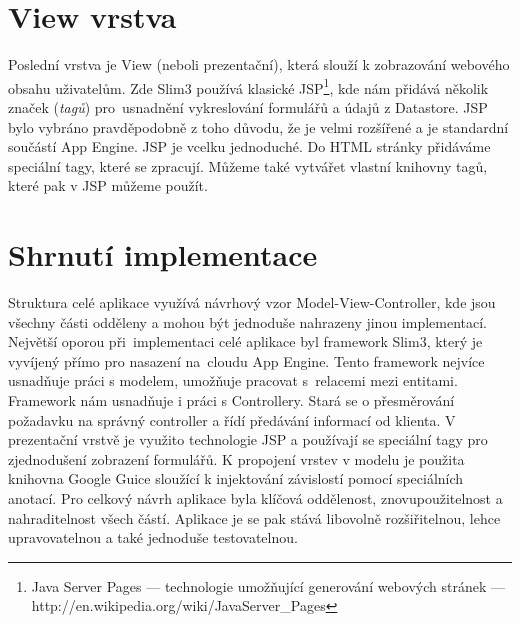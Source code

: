 \section{View vrstva}
Poslední vrstva je View (neboli prezentační), která slouží k zobrazování webového obsahu uživatelům. Zde Slim3 používá klasické JSP\footnote{Java Server Pages --- technologie umožňující generování webových stránek ---  http://en.wikipedia.org/wiki/JavaServer\_Pages}, kde nám přidává několik značek (\emph{tagů}) pro~usnadnění vykreslování formulářů a údajů z Datastore. JSP bylo vybráno pravděpodobně z toho důvodu, že je velmi rozšířené a je standardní součástí App Engine. JSP je vcelku jednoduché. Do HTML stránky přidáváme speciální tagy, které se zpracují. Můžeme také vytvářet vlastní knihovny tagů, které pak v JSP můžeme použít.

\section{Shrnutí implementace}
Struktura celé aplikace využívá návrhový vzor Model-View-Controller, kde jsou všechny části odděleny a mohou být jednoduše nahrazeny jinou implementací. Největší oporou při~implementaci celé aplikace byl framework Slim3, který je vyvíjený přímo pro nasazení na~cloudu App Engine. Tento framework nejvíce usnadňuje práci s modelem, umožňuje pracovat s~relacemi mezi entitami. Framework nám usnadňuje i práci s Controllery. Stará se o přesměrování požadavku na správný controller a řídí předávání informací od klienta. V prezentační vrstvě je využito technologie JSP a používají se speciální tagy pro zjednodušení zobrazení formulářů. K propojení vrstev v modelu je použita knihovna Google Guice sloužící k injektování závislostí pomocí speciálních anotací. Pro celkový návrh aplikace byla klíčová oddělenost, znovupoužitelnost a nahraditelnost všech částí. Aplikace je se pak stává libovolně rozšiřitelnou, lehce upravovatelnou a také jednoduše testovatelnou.